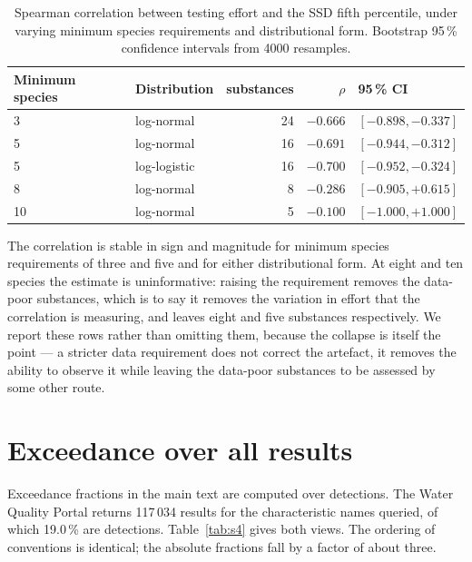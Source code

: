 \documentclass[preprint,11pt]{elsarticle}
\begin{document}
\begin{table}[htbp]
\centering
\caption{Spearman correlation between testing effort and the SSD fifth
percentile, under varying minimum species requirements and distributional form.
Bootstrap 95\,\% confidence intervals from 4000 resamples.}
\label{tab:s3}
\begin{tabular}{@{}l l r r l@{}}
\toprule
Minimum species & Distribution & substances & $\rho$ & 95\,\% CI \\
\midrule
3  & log-normal    & 24 & $-0.666$ & $[-0.898, -0.337]$ \\
5  & log-normal    & 16 & $-0.691$ & $[-0.944, -0.312]$ \\
5  & log-logistic  & 16 & $-0.700$ & $[-0.952, -0.324]$ \\
8  & log-normal    &  8 & $-0.286$ & $[-0.905, +0.615]$ \\
10 & log-normal    &  5 & $-0.100$ & $[-1.000, +1.000]$ \\
\bottomrule
\end{tabular}
\end{table}

The correlation is stable in sign and magnitude for minimum species
requirements of three and five and for either distributional form. At eight and
ten species the estimate is uninformative: raising the requirement removes the
data-poor substances, which is to say it removes the variation in effort that
the correlation is measuring, and leaves eight and five substances
respectively. We report these rows rather than omitting them, because the
collapse is itself the point --- a stricter data requirement does not correct the
artefact, it removes the ability to observe it while leaving the data-poor
substances to be assessed by some other route.

\section{Exceedance over all results}

Exceedance fractions in the main text are computed over detections. The Water
Quality Portal returns 117\,034 results for the characteristic names queried, of
which 19.0\,\% are detections. Table~\ref{tab:s4} gives both views.
The ordering of conventions is identical; the absolute fractions fall by a
factor of about three.
\end{document}

